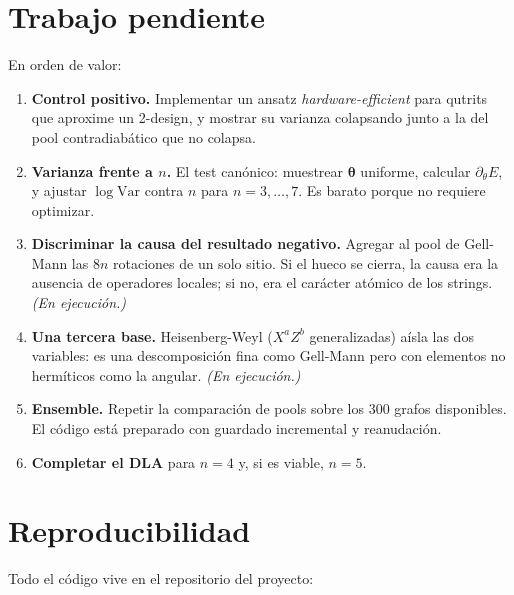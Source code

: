 \documentclass[11pt,a4paper]{article}
\begin{document}
\section{Trabajo pendiente}

En orden de valor:

\begin{enumerate}
\item \textbf{Control positivo.} Implementar un ansatz \emph{hardware-efficient}
para qutrits que aproxime un 2-design, y mostrar su varianza colapsando junto a
la del pool contradiabático que no colapsa.

\item \textbf{Varianza frente a $n$.} El test canónico: muestrear
$\boldsymbol\theta$ uniforme, calcular $\partial_\theta E$, y ajustar
$\log\mathrm{Var}$ contra $n$ para $n=3,\dots,7$. Es barato porque no requiere
optimizar.

\item \textbf{Discriminar la causa del resultado negativo.} Agregar al pool de
Gell-Mann las $8n$ rotaciones de un solo sitio. Si el hueco se cierra, la causa
era la ausencia de operadores locales; si no, era el carácter atómico de los
strings. \emph{(En ejecución.)}

\item \textbf{Una tercera base.} Heisenberg-Weyl ($X^aZ^b$ generalizadas)
aísla las dos variables: es una descomposición fina como Gell-Mann pero con
elementos no hermíticos como la angular. \emph{(En ejecución.)}

\item \textbf{Ensemble.} Repetir la comparación de pools sobre los 300 grafos
disponibles. El código está preparado con guardado incremental y reanudación.

\item \textbf{Completar el DLA} para $n=4$ y, si es viable, $n=5$.
\end{enumerate}

\section*{Reproducibilidad}

Todo el código vive en el repositorio del proyecto:
\end{document}
